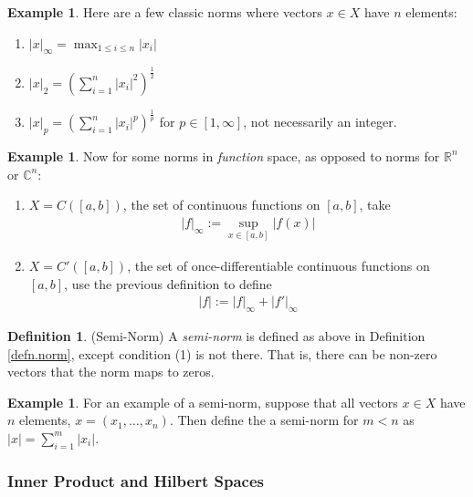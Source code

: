 \documentclass[12pt]{article}
\theoremstyle{plain}
\theoremstyle{definition}
\newtheorem{defn}[thm]{Definition}
\newtheorem{ex}[thm]{Example}
\theoremstyle{remark}
\begin{document}
\begin{ex}
Here are a few classic norms where vectors $x\in X$ have $n$ elements:
\begin{enumerate}
\item $\lvert x\rvert_\infty = \max_{1\leq i\leq n} |x_i|$
\item $\lvert x\rvert_2 = \left(\sum_{i=1}^n |x_i|^2\right)^{\frac{1}{2}}$
\item $\lvert x\rvert_p = \left(\sum_{i=1}^n
  |x_i|^p\right)^{\frac{1}{p}}$ for $p\in[1,\infty]$, not necessarily an
  integer.
\end{enumerate}
\end{ex}

\begin{ex}
Now for some norms in \emph{function} space, as opposed to norms for
$\mathbb{R}^n$ or $\mathbb{C}^n$:
\begin{enumerate}
\item $X=C([a,b])$, the set of continuous functions on $[a,b]$, take
  \begin{align*}
    \lvert f\rvert_\infty :=
    \sup_{x\in[a,b]} |f(x)|
  \end{align*}
\item $X=C'([a,b])$, the set of once-differentiable continuous functions
  on $[a,b]$, use the previous definition to define
  \begin{align*}
    \lvert f\rvert := \lvert f\rvert_\infty + \lvert f'\rvert_\infty
  \end{align*}
\end{enumerate}
\end{ex}

\begin{defn}(Semi-Norm)
A \emph{semi-norm} is defined as above in Definition \ref{defn.norm},
except condition (1) is not there. That is, there can be non-zero
vectors that the norm maps to zeros.
\end{defn}
\begin{ex}
For an example of a semi-norm, suppose that all vectors $x\in X$ have
$n$ elements, $x=(x_1,\ldots,x_n)$. Then define the a semi-norm for
$m<n$ as $\lvert x\rvert = \sum_{i=1}^m |x_i|$.
\end{ex}

\subsubsection{Inner Product and Hilbert Spaces}
\end{document}
